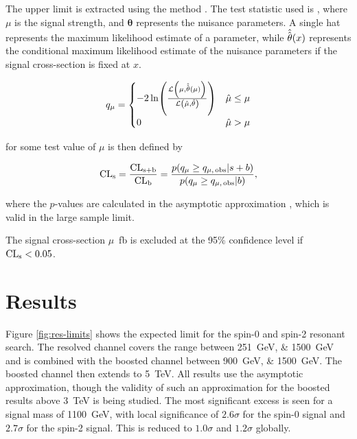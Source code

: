 The upper limit is extracted using the \CLs method \cite{Read02}. The test statistic 
used is \qmu \cite{Cowan11}, where $\mu$ is the signal strength, and $\mathbf{\theta}$ represents the nuisance
parameters. A single hat represents
the maximum likelihood estimate of a parameter, while
$\hat{\hat{\mathbf{\theta}}}\qty(x)$ represents the conditional maximum
likelihood estimate of the nuisance parameters if the signal cross-section is
fixed at $x$.


\begin{equation}
	\label{eqn:qmu-def}
	{q}_{\mu} =
	\begin{cases}
		-2\ln(\frac{\mathcal{L}\qty(\mu, \hat{\hat{\mathbf{\theta}}}\qty(\mu))}{\mathcal{L}\qty(\hat{\mu},
		\hat{\mathbf{\theta}})})              & \hat{\mu} \le \mu \\
		0                                     & \hat{\mu} > \mu
	\end{cases}
\end{equation}

\CLs for some test value of $\mu$ is then defined by

\begin{equation}
	\label{eqn:cls-def}
	\text{CL}\textsubscript{s} = \frac{\text{CL}\textsubscript{s+b}}{\text{CL}\textsubscript{b}} = \frac{p\qty({q}_{\mu} \ge {q}_{\mu,\,\text{obs}} | s + b)}{p\qty({q}_{\mu} \ge {q}_{\mu,\,\text{obs}} | b)},
\end{equation}

where the $p$-values are calculated in the asymptotic approximation
\cite{Cowan11}, which is valid in the large sample limit.

The signal cross-section {$\mu$}~\si{\femto\barn} is excluded at the 95\% confidence level if $\text{CL}\textsubscript{s} < 0.05$.

\FloatBarrier
\clearpage
\section{Results}
Figure \ref{fig:res-limits} shows the expected limit for the spin-0 and spin-2 resonant search. The 
resolved channel covers the range between \SIlist{251;1500}{\GeV} and is combined with the boosted channel between 
\SIlist{900;1500}{\GeV}. The boosted channel then extends to \SI{5}{\TeV}. All results use the asymptotic approximation, 
though the validity of such an approximation for the boosted results above \SI{3}{\TeV} is being studied. 
The most significant excess is seen for a signal mass of \SI{1100}{\GeV}, with local significance of 
$2.6\sigma$ for the spin-0 signal and 
$2.7\sigma$ for the spin-2 signal. This is reduced to $1.0\sigma$ and $1.2\sigma$ globally. 


